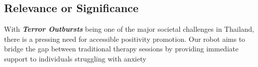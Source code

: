 \subsection{Relevance or Significance}
With \textbf{\textit{Terror Outbursts}} being one of the major societal challenges in Thailand, there is a pressing need for accessible positivity promotion. Our robot aims to bridge the gap between traditional therapy sessions by providing immediate support to individuals struggling with anxiety
